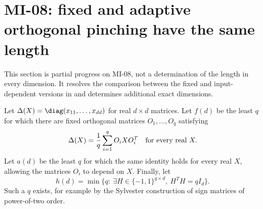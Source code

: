\section{MI-08: fixed and adaptive orthogonal pinching have the same length}
\label{sec:mi08}
This section is partial progress on MI-08, not a determination of the length in every dimension. It resolves the comparison between the fixed and input-dependent versions in \cite[Questions 4.8--4.9]{BL2026} and determines additional exact dimensions.

Let $\Delta(X)=\diag(x_{11},\ldots,x_{dd})$ for real $d\times d$ matrices. Let $f(d)$ be the least $q$ for which there are fixed orthogonal matrices $O_1,\ldots,O_q$ satisfying
\[
 \Delta(X)=\frac1q\sum_{i=1}^qO_iXO_i^T\quad\hbox{for every real }X.
\]
Let $a(d)$ be the least $q$ for which the same identity holds for every real $X$, allowing the matrices $O_i$ to depend on $X$. Finally, let
\[
 h(d)=\min\{q:\ \exists H\in\{-1,1\}^{q\times d},\ H^TH=qI_d\}.
\]
Such a $q$ exists, for example by the Sylvester construction of sign matrices of power-of-two order.

